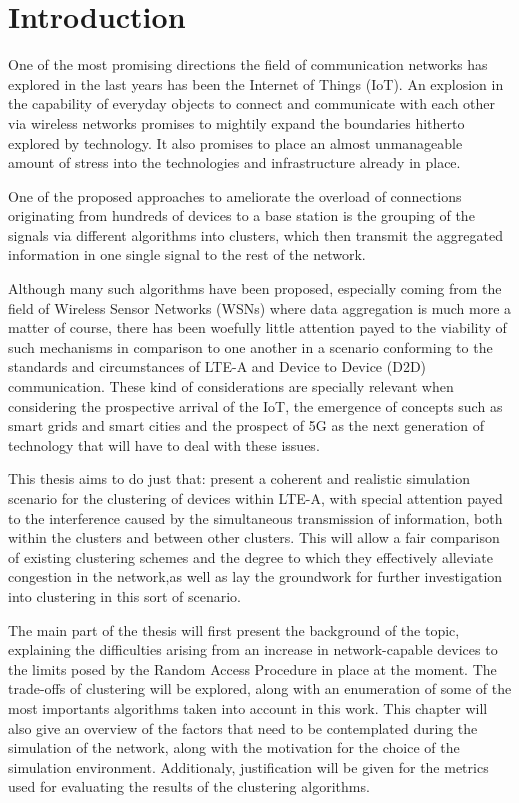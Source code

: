 \chapter{Introduction}

One of the most promising directions the field of communication networks has explored in the last years has been the Internet of Things (IoT). An explosion in the capability of everyday objects to connect and communicate with each other via wireless networks promises to mightily expand the boundaries hitherto explored by technology. It also promises to place an almost unmanageable amount of stress into the technologies and infrastructure already in place. 

One of the proposed approaches to ameliorate the overload of connections originating from hundreds of devices to a base station is the grouping of the signals via different algorithms into clusters, which then transmit the aggregated information in one single signal to the rest of the network. 

Although many such algorithms have been proposed, especially coming from the field of Wireless Sensor Networks (WSNs) where data aggregation is much more a matter of course, there has been woefully little attention payed to the viability of such mechanisms in comparison to one another in a scenario conforming to the standards and circumstances of LTE-A and Device to Device (D2D) communication. These kind of considerations are specially relevant when considering the prospective arrival of the IoT, the emergence of concepts such as smart grids and smart cities and the prospect of 5G as the next generation of technology that will have to deal with these issues. 

This thesis aims to do just that: present a coherent and realistic simulation scenario for the clustering of devices within LTE-A, with special attention payed to the interference caused by the simultaneous transmission of information, both within the clusters and between other clusters. This will allow a fair comparison of existing clustering schemes and the degree to which they effectively alleviate congestion in the network,as well as lay the groundwork for further investigation into clustering in this sort of scenario.

The main part of the thesis will first present the background of the topic, explaining the difficulties arising from an increase in network-capable devices to the limits posed by the Random Access Procedure in place at the moment. The trade-offs of clustering will be explored, along with an enumeration of some of the most importants algorithms taken into account in this work. This chapter will also give an overview of the factors that need to be contemplated during the simulation of the network, along with the motivation for the choice of the simulation environment. Additionaly, justification will be given for the metrics used for evaluating the results of the clustering algorithms.

